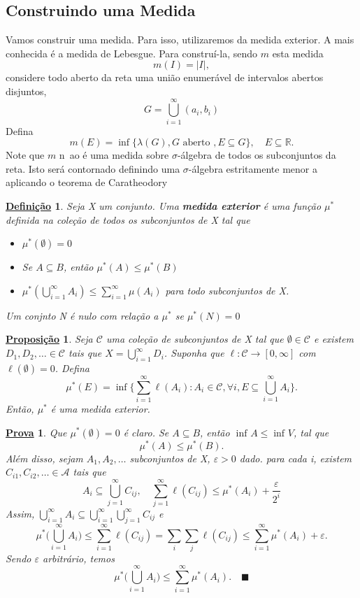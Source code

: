 \documentclass{article}
\newtheorem*{def*}{\underline{Defini\c c\~ao}}
\newtheorem*{prop*}{\underline{Proposi\c c\~ao}}
\newtheorem*{proof*}{\underline{Prova}}
\renewcommand\qedsymbol{$\blacksquare$}
\begin{document}
\subsection{Construindo uma Medida}
Vamos construir uma medida. Para isso, utilizaremos da medida exterior. A mais conhecida é a medida de Lebesgue. Para construí-la, sendo \(m \) esta medida
\[
	m(I) = |I|,
\]
considere todo aberto da reta uma união enumerável de intervalos abertos disjuntos,
\[
	G = \bigcup_{i=1}^{\infty}(a_{i}, b_{i})
\]
Defina
\[
	m (E) = \inf_{}\{\lambda (G), G \text{ aberto }, E\subseteq G\}, \quad E\subseteq \mathbb{R}.
\]
Note que \(m \) n~ao é uma medida sobre \(\sigma \)-álgebra de todos os subconjuntos da reta. Isto será contornado definindo uma \(\sigma \)-álgebra estritamente menor a aplicando o teorema de Caratheodory
\begin{def*}
	Seja X um conjunto. Uma \textbf{medida exterior} é uma função \(\mu ^{*}\) definida na coleção de todos os subconjuntos de X tal que
	\begin{itemize}
		\item[a)] \(\mu ^{*}(\emptyset ) = 0\)
		\item[b)] Se \(A\subseteq B\), então \(\mu ^{*}(A) \leq \mu ^{*}(B)\)
		\item[c)] \(\mu ^{*}(\bigcup_{i=1}^{\infty}A_{i}) \leq \sum\limits_{i=1}^{\infty}\mu (A_{i})\) para todo subconjuntos de X.
	\end{itemize}
	Um conjnto N é nulo com relação a \(\mu ^{*}\) se \(\mu ^{*}(N) = 0\)
\end{def*}
\begin{prop*}
	Seja \(\mathcal{C} \) uma coleção de subconjuntos de X tal que \(\emptyset \in \mathcal{C}\) e existem \(D_{1}, D_2, \dotsc \in \mathcal{C}\) tais que \(X = \bigcup_{i=1}^{\infty}D_{i}\).
	Suponha que \(\ell :\mathcal{C}\rightarrow [0, \infty]\) com \(\ell (\emptyset )= 0\). Defina
	\[
		\mu ^{*}(E) = \inf_{}\biggl\{\sum\limits_{i=1}^{\infty}\ell (A_{i}): A_{i}\in \mathcal{C}, \forall i, E\subseteq \bigcup_{i=1}^{\infty}A_{i}\biggr\}.
	\]
	Então, \(\mu ^{*}\) é uma medida exterior.
\end{prop*}
\begin{proof*}
	Que \(\mu ^{*}(\emptyset ) = 0\) é claro. Se \(A\subseteq B\), então \(\inf_{}A \leq \inf_{}V\), tal que
	\[
		\mu ^{*}(A) \leq \mu ^{*}(B).
	\]
	Além disso, sejam \(A_{1}, A_{2},\dotsc \) subconjuntos de X, \(\varepsilon > 0\) dado. para cada i, existem \(C_{i1}, C_{i2}, \dotsc \in \mathcal{A}\) tais que
	\[
		A_{i}\subseteq \bigcup_{j=1}^{\infty}C_{ij},\quad \sum\limits_{j=1}^{\infty}\ell (C_{ij})\leq \mu ^{*}(A_{i}) + \frac{\varepsilon }{2^{i}}
	\]
	Assim, \(\bigcup_{i=1}^{\infty}A_{i}\subseteq \bigcup_{i=1}^{\infty}\bigcup_{j=1}^{\infty}C_{ij}\) e
	\[
		\mu ^{*}\biggl(\bigcup_{i=1}^{\infty}A_{i}\biggr) \leq \sum\limits_{i=1}^{\infty}\ell (C_{ij}) = \sum\limits_{i}^{}\sum\limits_{j}^{}\ell (C_{ij}) \leq \sum\limits_{i=1}^{\infty}\mu ^{*}(A_{i}) + \varepsilon .
	\]
	Sendo \(\varepsilon \) arbitrário, temos
	\[
		\mu ^{*}\biggl(\bigcup_{i=1}^{\infty}A_{i}\biggr) \leq \sum\limits_{i=1}^{\infty}\mu ^{*}(A_{i}).\quad \text{\qedsymbol}
	\]
\end{proof*}
\end{document}
